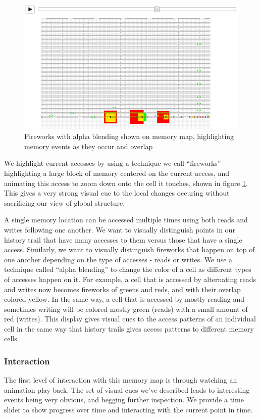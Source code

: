 \documentclass[annual]{acmsiggraph}
\begin{document}
    	\begin{figure}[t]
  		\centering
      \includegraphics[scale=0.40]{images/fireworks.png}
  		\caption{Fireworks with alpha blending shown on memory map, highlighting memory events as they occur and overlap}
      \label{fig:fireworks}
  	\end{figure}

  
  We highlight current accesses by using a technique we call ``fireworks'' - highlighting a large block of memory centered on the current access, and animating this access to zoom down onto the cell it touches, shown in figure \ref{fig:fireworks}. This gives a very strong visual cue to the local changes occuring without sacrificing our view of global structure.
  
  A single memory location can be accessed multiple times using both reads and writes following one another. We want to visually distinguish points in our history trail that have many accesses to them versus those that have a single access. Similarly, we want to visually distinguish fireworks that happen on top of one another depending on the type of accesses - reads or writes. We use a technique called ``alpha blending'' to change the color of a cell as different types of accesses happen on it. For example, a cell that is accessed by alternating reads and writes now becomes fireworks of greens and reds, and with their overlap colored yellow. In the same way, a cell that is accessed by mostly reading and sometimes writing will be colored mostly green (reads) with a small amount of red (writes). This display gives visual cues to the access patterns of an individual cell in the same way that history trails gives access patterns to different memory cells.
  
  \subsubsection{Interaction}
    The first level of interaction with this memory map is through watching an animation play back. The set of visual cues we've described leads to interesting events being very obvious, and begging further inspection. We provide a time slider to show progress over time and interacting with the current point in time.
    
\end{document}
